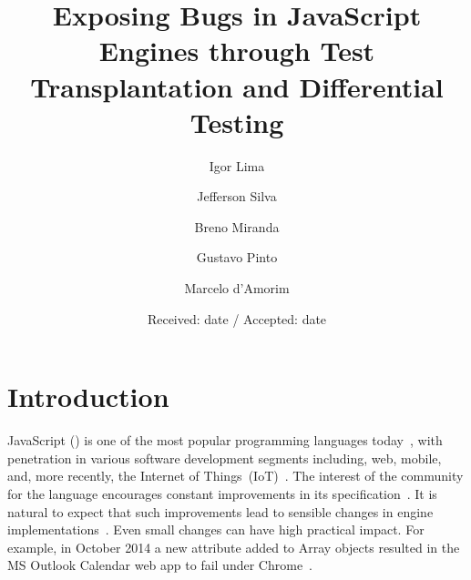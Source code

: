 \documentclass[smallextended]{svjour3}
\begin{document}
\title{Exposing Bugs in JavaScript Engines through Test Transplantation and Differential Testing}

\author{Igor Lima \and Jefferson Silva \and Breno Miranda\footnotemark
  \and Gustavo Pinto \and Marcelo d'Amorim}


\date{Received: date / Accepted: date}




\maketitle

\begin{abstract}
  
\end{abstract}

\section{Introduction}

JavaScript (\js{}) is one of the most popular programming languages
today~\cite{stackify,redmonk-javascript}, with penetration in various
software development segments including, web, mobile, and, more
recently, the Internet of Things~(IoT)~\cite{simply-technologies}. The
interest of the community for the language encourages constant
improvements in its specification~\cite{ecmas262-spec}. It is natural
to expect that such improvements lead to sensible changes in engine
implementations~\cite{kangax}. Even small changes can have high
practical impact. For example, in October 2014 a new attribute added
to Array objects resulted in the MS Outlook Calendar web app to fail
under Chrome~\cite{array-bug-chromium-issue4247,array-bug-discussion}.
\end{document}
